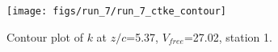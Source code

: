 \begin{figure}[H]
\centering
\texttt{[image: figs/run\_7/run\_7\_ctke\_contour]}
\caption{Contour plot of $k$ at $z/c$=5.37, $V_{free}$=27.02, station 1.}
\label{fig:run_7_ctke_contour}
\end{figure}


